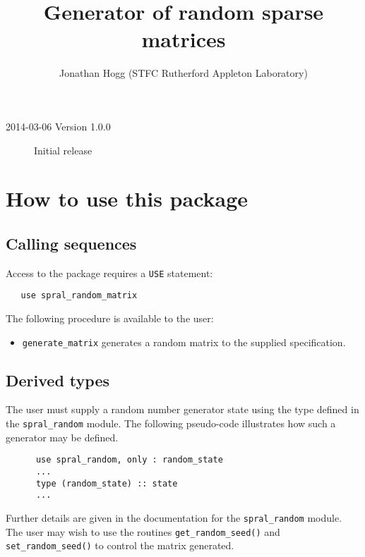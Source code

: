 \documentclass{spral}
\begin{document}
\title{Generator of random sparse matrices}
\author{Jonathan Hogg (STFC Rutherford Appleton Laboratory)}
\maketitle
\thispagestyle{firststyle}

\versionhistory
\begin{description}
\item[2014-03-06 Version 1.0.0] Initial release
\end{description}


\section{How to use this package}

\subsection{Calling sequences}

Access to the package requires a {\tt USE} statement:
\begin{verbatim}
   use spral_random_matrix
\end{verbatim}

\noindent
The following procedure is available to the user:
\begin{itemize}
\item {\tt generate\_matrix} generates a random matrix to the supplied
specification.
\end{itemize}


\subsection{Derived types} \label{derived types}

The user must supply a random number generator state using the type
defined in the \texttt{spral\_random} module. 
The following pseudo-code illustrates how such a generator may be defined.
\begin{verbatim}
      use spral_random, only : random_state
      ...
      type (random_state) :: state
      ...
\end{verbatim}
Further details are given in the documentation for the \texttt{spral\_random}
module. The user may wish to use the routines \texttt{get\_random\_seed()} and
\texttt{set\_random\_seed()} to control the matrix generated.
\end{document}
